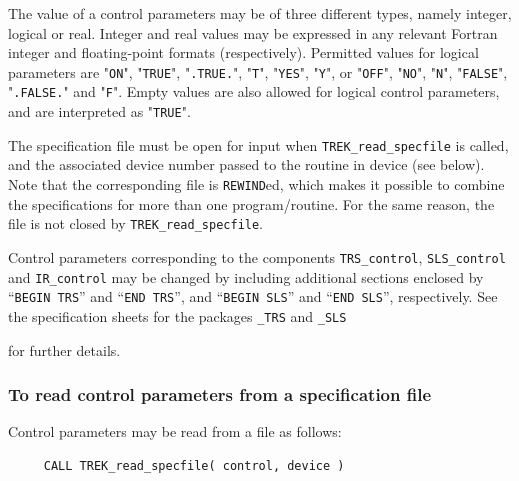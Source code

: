 \documentclass{galahad}
\newcommand{\packagename}{TREK}
\begin{document}
The value of a control parameters may be of three different types, namely
integer, logical or real.
Integer and real values may be expressed in any relevant Fortran integer and
floating-point formats (respectively). Permitted values for logical
parameters are "{\tt ON}", "{\tt TRUE}", "{\tt .TRUE.}", "{\tt T}",
"{\tt YES}", "{\tt Y}", or "{\tt OFF}", "{\tt NO}",
"{\tt N}", "{\tt FALSE}", "{\tt .FALSE.}" and "{\tt F}".
Empty values are also allowed for
logical control parameters, and are interpreted as "{\tt TRUE}".

The specification file must be open for
input when {\tt \packagename\_read\_specfile}
is called, and the associated device number
passed to the routine in device (see below).
Note that the corresponding
file is {\tt REWIND}ed, which makes it possible to combine the specifications
for more than one program/routine.  For the same reason, the file is not
closed by {\tt \packagename\_read\_specfile}.

Control parameters corresponding to the components
{\tt TRS\_control},
{\tt SLS\_control}
and
{\tt IR\_control} may be changed by including additional sections enclosed by
``{\tt BEGIN TRS}'' and
``{\tt END TRS}'', and
``{\tt BEGIN SLS}'' and
``{\tt END SLS}'', respectively.
See the specification sheets for the packages
{\tt \libraryname\_TRS}
and
{\tt \libraryname\_SLS}

for further details.

\subsubsection{To read control parameters from a specification file}
\label{readspec}

Control parameters may be read from a file as follows:
\hskip0.5in
\def\baselinestretch{0.8} {\tt \begin{verbatim}
     CALL TREK_read_specfile( control, device )
\end{verbatim}}
\def\baselinestretch{1.0}
\end{document}
